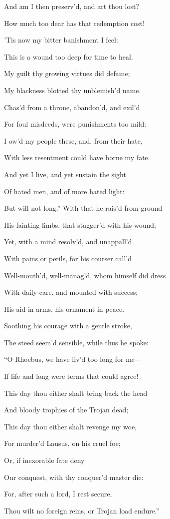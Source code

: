 And am I then preserv’d, and art thou lost?

How much too dear has that redemption cost!

’Tis now my bitter banishment I feel:

This is a wound too deep for time to heal.

My guilt thy growing virtues did defame;

My blackness blotted thy unblemish’d name.

Chas’d from a throne, abandon’d, and exil’d

For foul misdeeds, were punishments too mild:

I ow’d my people these, and, from their hate,

With less resentment could have borne my fate.

And yet I live, and yet sustain the sight

Of hated men, and of more hated light:

But will not long.” With that he rais’d from ground

His fainting limbs, that stagger’d with his wound;

Yet, with a mind resolv’d, and unappall’d

With pains or perils, for his courser call’d

Well-mouth’d, well-manag’d, whom himself did dress

With daily care, and mounted with success;

His aid in arms, his ornament in peace.

Soothing his courage with a gentle stroke,

The steed seem’d sensible, while thus he spoke:

“O Rhoebus, we have liv’d too long for me—

If life and long were terms that could agree!

This day thou either shalt bring back the head

And bloody trophies of the Trojan dead;

This day thou either shalt revenge my woe,

For murder’d Lausus, on his cruel foe;

Or, if inexorable fate deny

Our conquest, with thy conquer’d master die:

For, after such a lord, I rest secure,

Thou wilt no foreign reins, or Trojan load endure.”

